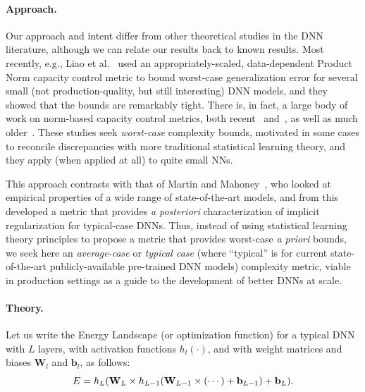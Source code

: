 \paragraph{Approach.} 
Our approach and intent differ from other theoretical studies in the DNN literature, although we can relate our results back to known results.
Most recently, e.g., Liao et al.~\cite{LMBx18_TR} used an appropriately-scaled, data-dependent Product Norm capacity control metric to bound worst-case generalization error for several small (not production-quality, but still interesting) DNN models, and they showed that the bounds are remarkably tight.
There is, in fact, a large body of work on norm-based capacity control metrics, both recent~\cite{LMBx18_TR, SHNx17_TR,PLMx18_TR} and~\cite{NTS14_TR,NTS15,NBMS17_TR,BFT17_TR,YM17_TR,KKB17_TR,NBS17_TR,AGNZ18_TR,ACH18_TR,ZF18_TR}, as well as much older~\cite{Bar97,MN09_TR}. 
These studies seek \emph{worst-case} complexity bounds, motivated in some cases to reconcile discrepancies with more traditional statistical learning theory, and they apply (when applied at all) to quite small NNs.

This approach contrasts with that of Martin and Mahoney~\cite{MM18_TR,MM19_HTSR_ICML}, who looked at empirical properties of a wide range of state-of-the-art models, and from this developed a metric that provides \emph{a posteriori} characterization of implicit regularization for typical-case DNNs.  
Thus, instead of using statistical learning theory principles to propose a metric that provides worst-case \emph{a priori} bounds, we seek here an \emph{average-case} or \emph{typical case} (where ``typical'' is for current state-of-the-art publicly-available pre-trained DNN models) complexity metric, viable in production settings as a guide to the development of better DNNs at scale.

\vspace{-2mm}
\paragraph{Theory.} 
Let us write the Energy Landscape (or optimization function) for a typical DNN with $L$ layers, with activation functions $h_{l}(\cdot)$, and with weight matrices and 
biases $\mathbf{W}_{l}$ and $\mathbf{b}_{l}$, as follows: 
\vspace{-2mm}
\begin{equation}
E=h_{L}(\mathbf{W}_{L}\times h_{L-1}(\mathbf{W}_{L-1}\times(\cdots)+\mathbf{b}_{L-1})+\mathbf{b}_{L})  .
\label{eqn:dnn_energy}
\vspace{-1mm}
\end{equation}

